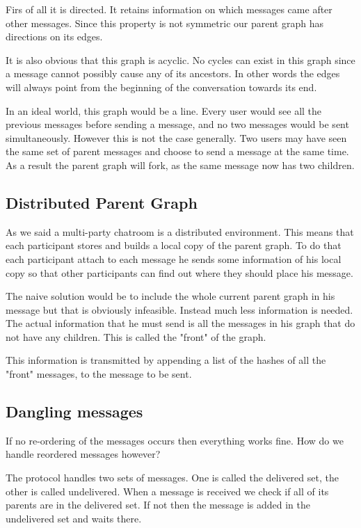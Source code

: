 Firs of all it is directed.
It retains information on which messages came after other messages.
Since this property is not symmetric our parent graph has directions on its edges.

It is also obvious that this graph is acyclic.
No cycles can exist in this graph since a message cannot possibly cause any of its ancestors.
In other words the edges will always point from the beginning of the conversation towards its end.

In an ideal world, this graph would be a line.
Every user would see  all the previous messages before sending a message, and no two messages would be sent simultaneously.
However this is not the case generally.
Two users may have seen the same set of parent messages and choose to send a message at the same time.
As a result the parent graph will fork, as the same message now has two children.

\subsection{Distributed Parent Graph}

As we said a multi-party chatroom is a distributed environment.
This means that each participant stores and builds a local copy of the parent graph.
To do that each participant attach to each message he sends some information of his local copy so that other participants can find out where they should place his message.

The naive solution would be to include the whole current parent graph in his message but that is obviously infeasible.
Instead much less information is needed.
The actual information that he must send is all the messages in his graph that do not have any children.
This is called the "front" of the graph.

This information is transmitted by appending a list of the hashes of all the "front" messages, to the message to be sent.

\subsection{Dangling messages}

If no re-ordering of the messages occurs then everything works fine.
How do we handle reordered messages however?

The protocol handles two sets of messages.
One is called the delivered set, the other is called undelivered.
When a message is received we check if all of its parents are in the delivered set.
If not then the message is added in the undelivered set and waits there.

